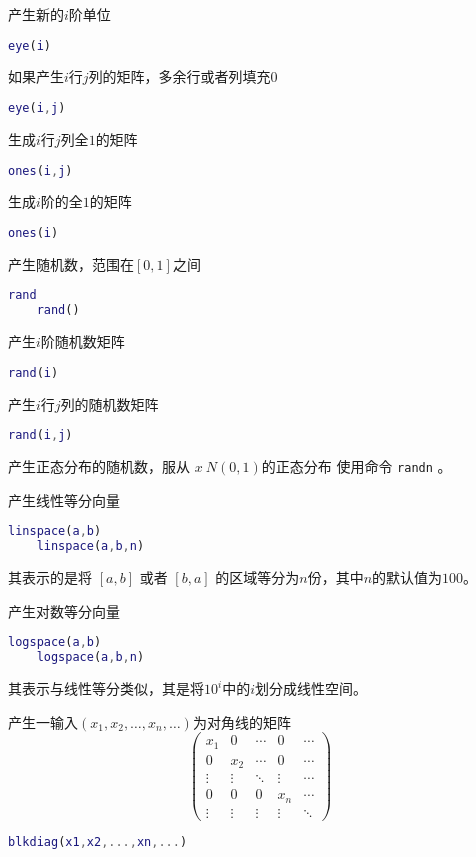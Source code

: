 \documentclass{ctexart}
\begin{document}
  产生新的$i$阶单位
  \begin{lstlisting}[language=matlab]
    eye(i)
  \end{lstlisting}
  如果产生$i$行$j$列的矩阵，多余行或者列填充0
  \begin{lstlisting}[language=matlab]
    eye(i,j)
  \end{lstlisting}

  生成$i$行$j$列全$1$的矩阵
  \begin{lstlisting}[language=matlab]
    ones(i,j)
  \end{lstlisting}
  生成$i$阶的全$1$的矩阵
  \begin{lstlisting}[language=matlab]
    ones(i)
  \end{lstlisting}

  产生随机数，范围在$[0,1]$之间
  \begin{lstlisting}[language=matlab]
    rand
    rand()
  \end{lstlisting}
  产生$i$阶随机数矩阵
  \begin{lstlisting}[language=matlab]
    rand(i)
  \end{lstlisting}
  产生$i$行$j$列的随机数矩阵
  \begin{lstlisting}[language=matlab]
    rand(i,j)
  \end{lstlisting}

  产生正态分布的随机数，服从 $x~N(0,1)$的正态分布
  使用命令 \lstinline|randn| 。

  产生线性等分向量
  \begin{lstlisting}[language=matlab]
    linspace(a,b)
    linspace(a,b,n)
  \end{lstlisting}
  其表示的是将 $[a,b]$ 或者 $[b,a]$ 的区域等分为$n$份，其中$n$的默认值为$100$。

  产生对数等分向量
  \begin{lstlisting}[language=matlab]
    logspace(a,b)
    logspace(a,b,n)
  \end{lstlisting}
  其表示与线性等分类似，其是将$10^i$中的$i$划分成线性空间。

  产生一输入$(x_1,x_2,\dots,x_n,\dots)$为对角线的矩阵
  $$\left(\begin{array}{ccccc}
  x_1    & 0      & \cdots & 0      & \cdots \\
  0      & x_2    & \cdots & 0      & \cdots \\
  \vdots & \vdots & \ddots & \vdots & \cdots \\
  0      & 0      & 0      & x_n    & \cdots \\
  \vdots & \vdots & \vdots & \vdots & \ddots
  \end{array}\right)$$  
  \begin{lstlisting}[language=matlab]
  blkdiag(x1,x2,...,xn,...)
  \end{lstlisting}
\end{document}
